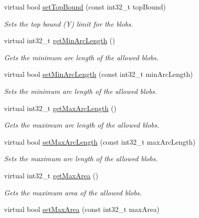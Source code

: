 \begin{DoxyCompactItemize}
virtual bool \mbox{\hyperlink{classlbpExtract__IDLServer_a50677882bf32262601b91046a2dcdbf2}{set\+Top\+Bound}} (const int32\+\_\+t top\+Bound)
\begin{DoxyCompactList}\small\item\em Sets the top bound (Y) limit for the blobs. \end{DoxyCompactList}\item 
virtual int32\+\_\+t \mbox{\hyperlink{classlbpExtract__IDLServer_ae98976e14296fd7fd3596da8faf862d3}{get\+Min\+Arc\+Length}} ()
\begin{DoxyCompactList}\small\item\em Gets the minimum arc length of the allowed blobs. \end{DoxyCompactList}\item 
virtual bool \mbox{\hyperlink{classlbpExtract__IDLServer_abd1ebed4459c05a4b849f8eebea14127}{set\+Min\+Arc\+Length}} (const int32\+\_\+t min\+Arc\+Length)
\begin{DoxyCompactList}\small\item\em Sets the minimum arc length of the allowed blobs. \end{DoxyCompactList}\item 
virtual int32\+\_\+t \mbox{\hyperlink{classlbpExtract__IDLServer_ae6f220a2b984c7211bd59beca4db0373}{get\+Max\+Arc\+Length}} ()
\begin{DoxyCompactList}\small\item\em Gets the maximum arc length of the allowed blobs. \end{DoxyCompactList}\item 
virtual bool \mbox{\hyperlink{classlbpExtract__IDLServer_abc379ba01952949df03f977c74884ade}{set\+Max\+Arc\+Length}} (const int32\+\_\+t max\+Arc\+Length)
\begin{DoxyCompactList}\small\item\em Sets the maximum arc length of the allowed blobs. \end{DoxyCompactList}\item 
virtual int32\+\_\+t \mbox{\hyperlink{classlbpExtract__IDLServer_a46c4f38052cd2abd334e4e0f0263fab4}{get\+Max\+Area}} ()
\begin{DoxyCompactList}\small\item\em Gets the maximum area of the allowed blobs. \end{DoxyCompactList}\item 
virtual bool \mbox{\hyperlink{classlbpExtract__IDLServer_a81dbd91a1460cdb450a7f7824e6d9953}{set\+Max\+Area}} (const int32\+\_\+t max\+Area)

\end{DoxyCompactItemize}
